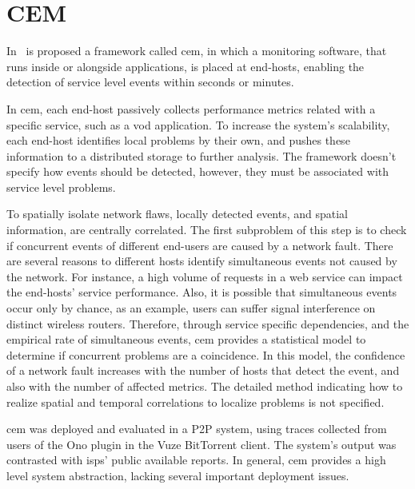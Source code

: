 \section{CEM}

In~\cite{crowdsourcing_service_level_network_event_monitoring} is proposed a
framework called \gls*{cem}, in which a
monitoring software, that runs inside or alongside applications, is placed at
end-hosts, enabling the detection of service level events within seconds or
minutes.

In \gls*{cem}, each end-host passively collects performance metrics related with
a specific service, such as a \gls*{vod} application.
To increase the system's scalability,
each end-host identifies local problems by their own,
and pushes these information to a distributed storage to further analysis.
The framework doesn't specify how events should be detected,
however, they must be associated with service level problems.

To spatially isolate network flaws, locally detected events, and spatial
information, are centrally correlated.
The first subproblem of this step is to check if concurrent events
of different end-users are caused by a
network fault. There are several reasons to different hosts identify
simultaneous events not caused by the network.
For instance, a high volume of requests in a web service can impact the
end-hosts' service performance. Also, it is
possible that simultaneous events occur only by chance, as an example, users
can suffer signal interference on distinct wireless routers.
Therefore, through service specific dependencies, and the empirical rate of
simultaneous
events, \gls*{cem} provides a statistical model to determine if
concurrent problems are a coincidence.
In this model, the confidence of a network fault increases with the
number of hosts that detect the event, and also with the number of affected
metrics.
The detailed method indicating how to realize spatial and temporal
correlations to
localize problems is not specified.

\gls*{cem} was deployed and evaluated in a P2P system, using traces
collected
from users of the Ono plugin in the Vuze BitTorrent client. The system's
output was contrasted with \glspl*{isp}' public available reports. In general,
\gls*{cem} provides a high level system abstraction, lacking several
important deployment issues.
